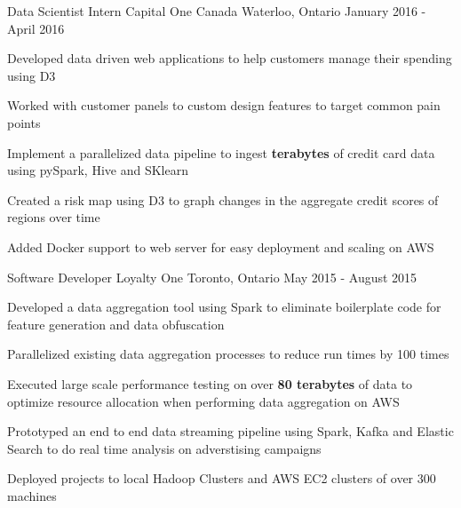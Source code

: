 \begin{cventries}

\cventry
{Data Scientist Intern}
{Capital One Canada}
{Waterloo, Ontario}
{January 2016 - April 2016}
{ %
\begin{cvitems}
\item {Developed data driven web applications to help customers manage their spending using D3}
\item {Worked with customer panels to custom design features to target common pain points}
\item {Implement a parallelized data pipeline to ingest \textbf{terabytes} of credit card data using pySpark, Hive and SKlearn}
\item {Created a risk map using D3 to graph changes in the aggregate credit scores of regions over time}
\item {Added Docker support to web server for easy deployment and scaling on AWS}
\end{cvitems}
}


\cventry
{Software Developer}
{Loyalty One} %
{Toronto, Ontario} %
{May 2015 - August 2015} %
{
\begin{cvitems}
\item {Developed a data aggregation tool using Spark to eliminate boilerplate code for feature generation and data obfuscation}
\item {Parallelized existing data aggregation processes to reduce run times by 100 times}
\item {Executed large scale performance testing on over \textbf{80 terabytes} of data to optimize resource allocation when performing data aggregation on AWS}
\item {Prototyped an end to end data streaming pipeline using Spark, Kafka and Elastic Search to do real time analysis on adverstising campaigns}
\item {Deployed projects to local Hadoop Clusters and AWS EC2 clusters of over 300 machines}
\end{cvitems}
}


\end{cventries}
